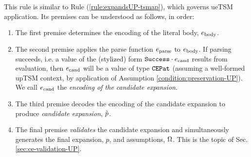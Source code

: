 {{{{\noindent
This rule is similar to Rule (\ref{rule:expandsUP-tsmap}), which governs ueTSM application. Its premises can be understood as follows, in order:
\begin{enumerate}
\item The first premise determines the encoding of the literal body, $e_\text{body}$.
\item The second premise applies the parse function $e_\text{parse}$ to $e_\text{body}$. If parsing succeeds, i.e. a value of the (stylized) form $\mathtt{Success} \cdot e_\text{cand}$ results from evaluation, then $e_\text{cand}$ will be a value of type $\mathtt{CEPat}$ (assuming a well-formed upTSM context, by application of Assumption \ref{condition:preservation-UP}). We call $e_\text{cand}$ the \emph{encoding of the candidate expansion}.
\item The third premise decodes the encoding of the candidate expansion to produce \emph{candidate expansion}, $\grave{p}$.
\item The final premise \emph{validates} the candidate expansion and simultaneously generates the final expansion, $p$, and assumptions, $\Omega$. This is the topic of Sec. \ref{sec:ce-validation-UP}.
\end{enumerate}

}}}}
